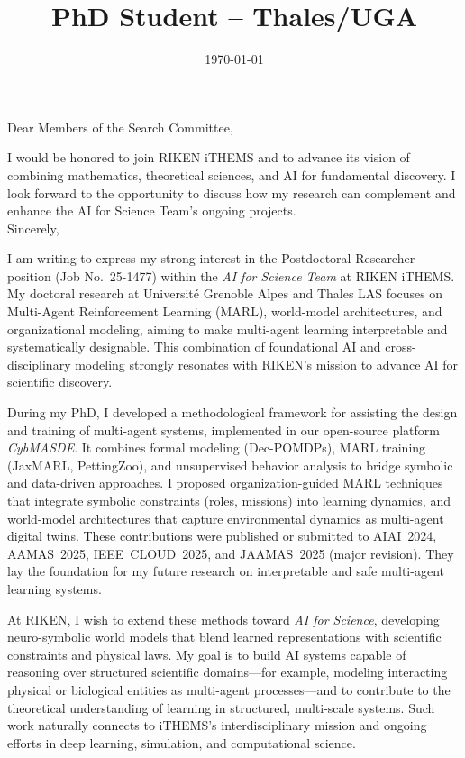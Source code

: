 \documentclass[11pt,a4paper,sans]{moderncv}
\title{PhD Student -- Thales/UGA}
\begin{document}
\date{\today}
\opening{Dear Members of the Search Committee,}
\closing{{I would be honored to join RIKEN iTHEMS and to advance its vision of combining mathematics, theoretical sciences, and AI for fundamental discovery. I look forward to the opportunity to discuss how my research can complement and enhance the AI for Science Team’s ongoing projects.}\\[0.6cm]Sincerely,\\[0.1cm]\vspace{-0.6cm}}

\makelettertitle

\justifying

I am writing to express my strong interest in the Postdoctoral Researcher position (Job No.~25-1477) within the \textit{AI for Science Team} at RIKEN iTHEMS. My doctoral research at Université Grenoble Alpes and Thales LAS focuses on Multi-Agent Reinforcement Learning (MARL), world-model architectures, and organizational modeling, aiming to make multi-agent learning interpretable and systematically designable. This combination of foundational AI and cross-disciplinary modeling strongly resonates with RIKEN’s mission to advance AI for scientific discovery.

During my PhD, I developed a methodological framework for assisting the design and training of multi-agent systems, implemented in our open-source platform \textit{CybMASDE}. It combines formal modeling (Dec-POMDPs), MARL training (JaxMARL, PettingZoo), and unsupervised behavior analysis to bridge symbolic and data-driven approaches. I proposed organization-guided MARL techniques that integrate symbolic constraints (roles, missions) into learning dynamics, and world-model architectures that capture environmental dynamics as multi-agent digital twins. These contributions were published or submitted to AIAI~2024, AAMAS~2025, IEEE~CLOUD~2025, and JAAMAS~2025 (major revision). They lay the foundation for my future research on interpretable and safe multi-agent learning systems.

At RIKEN, I wish to extend these methods toward \textit{AI for Science}, developing neuro-symbolic world models that blend learned representations with scientific constraints and physical laws. My goal is to build AI systems capable of reasoning over structured scientific domains---for example, modeling interacting physical or biological entities as multi-agent processes---and to contribute to the theoretical understanding of learning in structured, multi-scale systems. Such work naturally connects to iTHEMS’s interdisciplinary mission and ongoing efforts in deep learning, simulation, and computational science.
\end{document}
